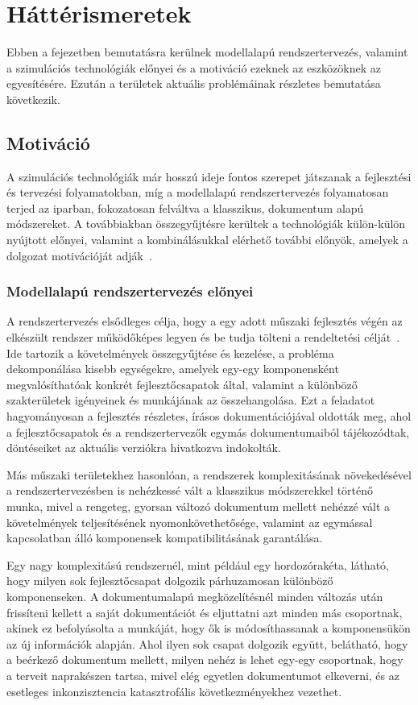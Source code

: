 \chapter{Háttérismeretek}
Ebben a fejezetben bemutatásra kerülnek modellalapú rendszertervezés, valamint a szimulációs technológiák előnyei és a motiváció ezeknek az eszközöknek az egyesítésére.
Ezután a területek aktuális problémáinak részletes bemutatása következik.

\section{Motiváció}
    A szimulációs technológiák már hosszú ideje fontos szerepet játszanak a fejlesztési és tervezési folyamatokban, míg a modellalapú rendszertervezés folyamatosan terjed az iparban, fokozatosan felváltva a klasszikus, dokumentum alapú módszereket.
    A továbbiakban összegyűjtésre kerültek a technológiák külön-külön nyújtott előnyei, valamint a kombinálásukkal elérhető további előnyök, amelyek a dolgozat motivációját adják~\cite{Madni_2018, Bajaj_2022}.
    
    \subsection{Modellalapú rendszertervezés előnyei} \label{sec:mbseElonyei}
        A rendszertervezés elsődleges célja, hogy a egy adott műszaki fejlesztés végén az elkészült rendszer működőképes legyen és be tudja tölteni a rendeltetési célját~\cite{Bajaj_2022, Gianni2017}.
        Ide tartozik a követelmények összegyűjtése és kezelése, a probléma dekomponálása kisebb egységekre, amelyek egy-egy komponensként megvalósíthatóak konkrét fejlesztőcsapatok által, valamint a különböző szakterületek igényeinek és munkájának az összehangolása.
        Ezt a feladatot hagyományosan a fejlesztés részletes, írásos dokumentációjával oldották meg, ahol a fejlesztőcsapatok és a rendszertervezők egymás dokumentumaiból tájékozódtak, döntéseiket az aktuális verziókra hivatkozva indokolták.

        Más műszaki területekhez hasonlóan, a rendszerek komplexitásának növekedésével a rendszertervezésben is nehézkessé vált a klasszikus módszerekkel történő munka, mivel a rengeteg, gyorsan változó dokumentum mellett nehézzé vált a követelmények teljesítésének nyomonkövethetősége, valamint az egymással kapcsolatban álló komponensek kompatibilitásának garantálása.
        
        Egy nagy komplexitású rendszernél, mint például egy hordozórakéta, látható, hogy milyen sok fejlesztőcsapat dolgozik párhuzamosan különböző komponenseken. A dokumentumalapú megközelítésnél minden változás után frissíteni kellett a saját dokumentációt és eljuttatni azt minden más csoportnak, akinek ez befolyásolta a munkáját, hogy ők is módosíthassanak a komponensükön az új információk alapján.
        Ahol ilyen sok csapat dolgozik együtt, belátható, hogy a beérkező dokumentum mellett, milyen nehéz is lehet egy-egy csoportnak, hogy a terveit naprakészen tartsa, mivel elég egyetlen dokumentumot elkeverni, és az esetleges inkonzisztencia katasztrofális következményekhez vezethet.
        
